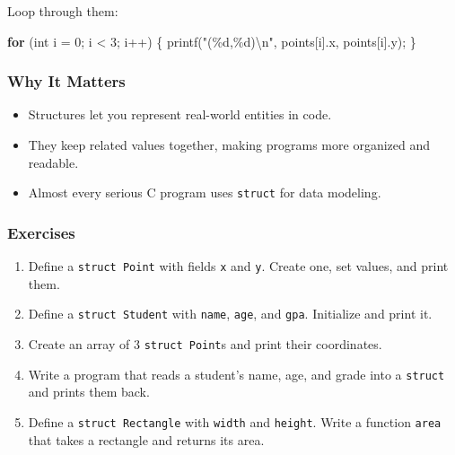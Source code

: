 \documentclass[
  letterpaper,
  DIV=11,
  numbers=noendperiod]{scrreprt}
\newenvironment{Shaded}{\begin{snugshade}}{\end{snugshade}}
\newcommand{\ControlFlowTok}[1]{\textcolor[rgb]{0.00,0.23,0.31}{\textbf{#1}}}
\newcommand{\DataTypeTok}[1]{\textcolor[rgb]{0.68,0.00,0.00}{#1}}
\newcommand{\DecValTok}[1]{\textcolor[rgb]{0.68,0.00,0.00}{#1}}
\newcommand{\NormalTok}[1]{\textcolor[rgb]{0.00,0.23,0.31}{#1}}
\newcommand{\OperatorTok}[1]{\textcolor[rgb]{0.37,0.37,0.37}{#1}}
\newcommand{\SpecialCharTok}[1]{\textcolor[rgb]{0.37,0.37,0.37}{#1}}
\newcommand{\StringTok}[1]{\textcolor[rgb]{0.13,0.47,0.30}{#1}}
\providecommand{\tightlist}{%
  \setlength{\itemsep}{0pt}\setlength{\parskip}{0pt}}
\begin{document}
Loop through them:

\begin{Shaded}
\begin{Highlighting}[]
\ControlFlowTok{for} \OperatorTok{(}\DataTypeTok{int}\NormalTok{ i }\OperatorTok{=} \DecValTok{0}\OperatorTok{;}\NormalTok{ i }\OperatorTok{\textless{}} \DecValTok{3}\OperatorTok{;}\NormalTok{ i}\OperatorTok{++)} \OperatorTok{\{}
\NormalTok{    printf}\OperatorTok{(}\StringTok{"(}\SpecialCharTok{\%d}\StringTok{,}\SpecialCharTok{\%d}\StringTok{)}\SpecialCharTok{\textbackslash{}n}\StringTok{"}\OperatorTok{,}\NormalTok{ points}\OperatorTok{[}\NormalTok{i}\OperatorTok{].}\NormalTok{x}\OperatorTok{,}\NormalTok{ points}\OperatorTok{[}\NormalTok{i}\OperatorTok{].}\NormalTok{y}\OperatorTok{);}
\OperatorTok{\}}
\end{Highlighting}
\end{Shaded}

\subsubsection{Why It Matters}\label{why-it-matters-34}

\begin{itemize}
\tightlist
\item
  Structures let you represent real-world entities in code.
\item
  They keep related values together, making programs more organized and
  readable.
\item
  Almost every serious C program uses \texttt{struct} for data modeling.
\end{itemize}

\subsubsection{Exercises}\label{exercises-35}

\begin{enumerate}
\def\labelenumi{\arabic{enumi}.}
\tightlist
\item
  Define a \texttt{struct\ Point} with fields \texttt{x} and \texttt{y}.
  Create one, set values, and print them.
\item
  Define a \texttt{struct\ Student} with \texttt{name}, \texttt{age},
  and \texttt{gpa}. Initialize and print it.
\item
  Create an array of 3 \texttt{struct\ Point}s and print their
  coordinates.
\item
  Write a program that reads a student's name, age, and grade into a
  \texttt{struct} and prints them back.
\item
  Define a \texttt{struct\ Rectangle} with \texttt{width} and
  \texttt{height}. Write a function \texttt{area} that takes a rectangle
  and returns its area.
\end{enumerate}
\end{document}
